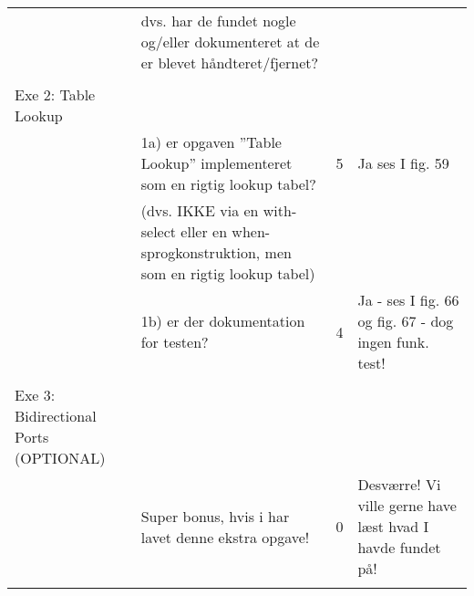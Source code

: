 \begin{table}[h]
\begin{tabularx}{\textwidth}{p{3.5cm}Xp{5mm}X}
                                                               & dvs. har de fundet nogle og/eller dokumenteret at de er blevet håndteret/fjernet?              &   &                                                                           \\
                                                               &                                                                                                &   &                                                                           \\\midrule
        Exe 2: Table Lookup                                    &                                                                                                &   &                                                                           \\
                                                               & 1a) er opgaven ”Table Lookup” implementeret som en rigtig lookup tabel?                        & 5 & Ja ses I fig. 59                                                          \\
                                                               & (dvs. IKKE via en with-select eller en when-sprogkonstruktion, men som en rigtig lookup tabel) &   &                                                                           \\
                                                               & 1b) er der dokumentation for testen?                                                           & 4 & Ja - ses I fig. 66 og fig. 67 - dog ingen funk. test!                     \\
                                                               &                                                                                                &   &                                                                           \\\midrule
        Exe 3: Bidirectional Ports (OPTIONAL)                  &                                                                                                &   &                                                                           \\
                                                               & Super bonus, hvis i har lavet denne ekstra opgave!                                             & 0 & Desværre! Vi ville gerne have læst hvad I havde fundet på!                \\
                                                               &
    \end{tabularx}
\end{table}
